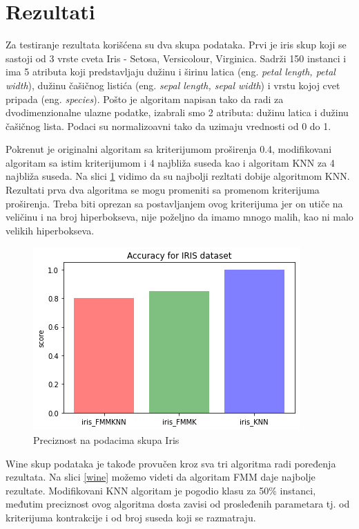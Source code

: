 \documentclass[a4paper]{article}
\begin{document}
\section{Rezultati}
\label{sec:rezultati}

Za testiranje rezultata korišćena su dva skupa podataka. Prvi je iris 
skup koji se sastoji od 3 vrste cveta Iris - Setosa, Versicolour, Virginica. 
Sadrži 150 instanci i ima 5 atributa koji predstavljaju dužinu i širinu latica 
(eng. \emph{petal length, petal width}), dužinu čašičnog listića (eng. \emph{sepal length, sepal width}) i 
vrstu kojoj cvet pripada (eng. \emph{species}). Pošto je algoritam napisan tako da radi za dvodimenzionalne 
ulazne podatke,  izabrali smo 2 atributa: dužinu latica i dužinu čašičnog lista. Podaci su normalizoavni tako da uzimaju 
vrednosti od 0 do 1.

Pokrenut je originalni algoritam sa kriterijumom proširenja 0.4, modifikovani algoritam sa istim kriterijumom i 4 najbliža suseda kao i 
algoritam KNN za 4 najbliža suseda. Na slici \ref{iris} vidimo da su najbolji rezltati dobije algoritmom KNN. Rezultati prva dva algoritma 
se mogu promeniti sa promenom kriterijuma proširenja. Treba biti oprezan sa postavljanjem ovog kriterijuma jer on utiče na veličinu i na 
broj hiperbokseva, nije poželjno da imamo mnogo malih, kao ni malo velikih hiperbokseva. 

\begin{figure}[h!]
\centering
\captionsetup{justification=centering,margin=2cm}
\begin{center}
\includegraphics[scale=0.5]{img/iris.png}
\end{center}
\caption{Preciznost na podacima skupa Iris}
\label{iris}
\end{figure}

Wine skup podataka je takođe provučen kroz sva tri algoritma radi poređenja rezultata. Na slici \ref{wine} možemo videti
da algoritam FMM daje najbolje rezultate. Modifikovani KNN algoritam je pogodio klasu za 50\% instanci, međutim preciznost 
ovog algoritma dosta zavisi od prosleđenih parametara tj. od kriterijuma kontrakcije i od broj suseda koji se razmatraju.
\end{document}
